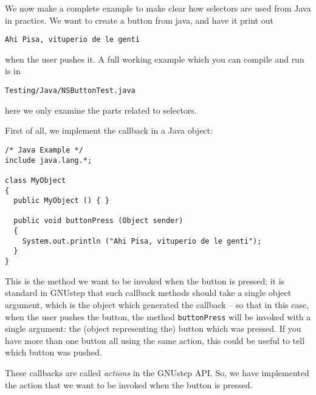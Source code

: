 We now make a complete example to make clear how selectors are used
from Java in practice.  We want to create a button from java, and have
it print out
\begin{verbatim}
Ahi Pisa, vituperio de le genti
\end{verbatim}
when the user pushes it.  A full working example which you can compile
and run is in 
\begin{verbatim}
Testing/Java/NSButtonTest.java
\end{verbatim}
here we only examine the parts related to selectors.

First of all, we implement the callback in a Java object: 
\begin{verbatim}
/* Java Example */
include java.lang.*;

class MyObject
{
  public MyObject () { }

  public void buttonPress (Object sender)
  {
    System.out.println ("Ahi Pisa, vituperio de le genti");
  }
}
\end{verbatim}
This is the method we want to be invoked when the button is pressed;
it is standard in GNUstep that such callback methods should take a
single object argument, which is the object which generated the
callback -- so that in this case, when the user pushes the button, the
method \texttt{buttonPress} will be invoked with a single argument:
the (object representing the) button which was pressed.  If you have
more than one button all using the same action, this could be useful
to tell which button was pushed.

These callbacks are called \emph{actions} in the GNUstep API.  So, we
have implemented the action that we want to be invoked when the button
is pressed.

